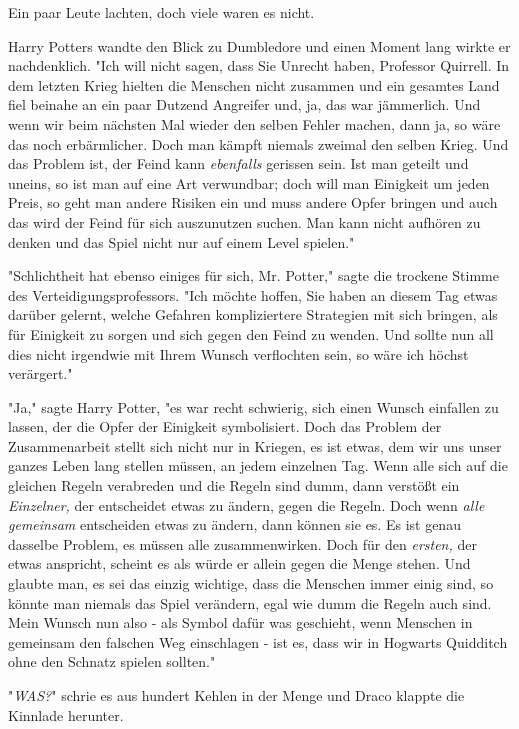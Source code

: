 {Ein paar Leute lachten, doch viele waren es nicht.

Harry Potters wandte den Blick zu Dumbledore und einen Moment lang wirkte er nachdenklich. "Ich will nicht sagen, dass Sie Unrecht haben, Professor Quirrell. In dem letzten Krieg hielten die Menschen nicht zusammen und ein gesamtes Land fiel beinahe an ein paar Dutzend Angreifer und, ja, das war jämmerlich. Und wenn wir beim nächsten Mal wieder den selben Fehler machen, dann ja, so wäre das noch erbärmlicher. Doch man kämpft niemals zweimal den selben Krieg. Und das Problem ist, der Feind kann \emph{ebenfalls} gerissen sein. Ist man geteilt und uneins, so ist man auf eine Art verwundbar; doch will man Einigkeit um jeden Preis, so geht man andere Risiken ein und muss andere Opfer bringen und auch das wird der Feind für sich auszunutzen suchen. Man kann nicht aufhören zu denken und das Spiel nicht nur auf einem Level spielen."

"Schlichtheit hat ebenso einiges für sich, Mr. Potter," sagte die trockene Stimme des Verteidigungsprofessors. "Ich möchte hoffen, Sie haben an diesem Tag etwas darüber gelernt, welche Gefahren kompliziertere Strategien mit sich bringen, als für Einigkeit zu sorgen und sich gegen den Feind zu wenden. Und sollte nun all dies nicht irgendwie mit Ihrem Wunsch verflochten sein, so wäre ich höchst verärgert."

"Ja," sagte Harry Potter, "es war recht schwierig, sich einen Wunsch einfallen zu lassen, der die Opfer der Einigkeit symbolisiert. Doch das Problem der Zusammenarbeit stellt sich nicht nur in Kriegen, es ist etwas, dem wir uns unser ganzes Leben lang stellen müssen, an jedem einzelnen Tag. Wenn alle sich auf die gleichen Regeln verabreden und die Regeln sind dumm, dann verstößt ein \emph{Einzelner,} der entscheidet etwas zu ändern, gegen die Regeln. Doch wenn \emph{alle gemeinsam} entscheiden etwas zu ändern, dann können sie es. Es ist genau dasselbe Problem, es müssen alle zusammenwirken. Doch für den \emph{ersten,} der etwas anspricht, scheint es als würde er allein gegen die Menge stehen. Und glaubte man, es sei das einzig wichtige, dass die Menschen immer einig sind, so könnte man niemals das Spiel verändern, egal wie dumm die Regeln auch sind. Mein Wunsch nun also - als Symbol dafür was geschieht, wenn Menschen in gemeinsam den falschen Weg einschlagen - ist es, dass wir in Hogwarts Quidditch ohne den Schnatz spielen sollten."

"\emph{WAS?}" schrie es aus hundert Kehlen in der Menge und Draco klappte die Kinnlade herunter.

}
